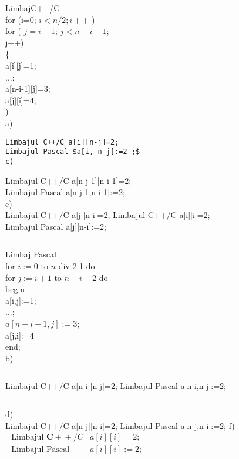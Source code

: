LimbajC++/C\\
for (i=0; $i<n / 2 ; i++$ )\\
for ( $j=i+1$; $j<n-i-1$;\\
j++)\\
\{\\[0pt]
a[i][j]=1;\\
...;\\[0pt]
a[n-i-1][j]=3;\\[0pt]
a[j][i]=4;\\
)\\
a)

\begin{verbatim}
Limbajul C++/C a[i][n-j]=2;
Limbajul Pascal $a[i, n-j]:=2 ;$
c)
\end{verbatim}

Limbajul C++/C a[n-j-1][n-i-1]=2;\\[0pt]
Limbajul Pascal a[n-j-1,n-i-1]:=2;\\
e)\\[0pt]
Limbajul C++/C a[j][n-i]=2; Limbajul C++/C a[i][i]=2;\\[0pt]
Limbajul Pascal a[j][n-i]:=2;

\begin{verbatim}

\end{verbatim}

Limbaj Pascal\\
for $i:=0$ to $n$ div 2-1 do\\
for $j:=i+1$ to $n-i-2$ do\\
begin\\[0pt]
a[i,j]:=1;\\
...;\\
$a[n-i-1, j]:=3$;\\[0pt]
a[j,i]:=4\\
end;\\
b)

\begin{verbatim}

\end{verbatim}

Limbajul C++/C a[n-i][n-j]=2; Limbajul Pascal a[n-i,n-j]:=2;

\begin{verbatim}

\end{verbatim}

d)\\[0pt]
Limbajul C++/C a[n-j][n-i]=2; Limbajul Pascal a[n-j,n-i]:=2; f)\\
$\begin{array}{ll}\text { Limbajul } \mathbf{C +}+/ C & a[i][i]=2 ; \\ \text { Limbajul Pascal } & a[i][i]:=2 ;\end{array}$

